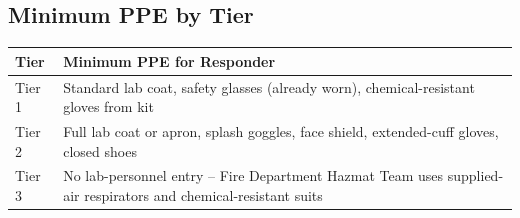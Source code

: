 \subsection*{Minimum PPE by Tier}
\renewcommand{\arraystretch}{1.2}
\begin{tabularx}{\linewidth}{@{}l X@{}}
\toprule
\textbf{Tier} & \textbf{Minimum PPE for Responder}\\
\midrule
Tier 1 & Standard lab coat, safety glasses (already worn), chemical-resistant gloves from kit\\
Tier 2 & Full lab coat or apron, splash goggles, face shield, extended-cuff gloves, closed shoes\\
Tier 3 & No lab-personnel entry -- Fire Department Hazmat Team uses supplied-air respirators and
  chemical-resistant suits\\
\bottomrule
\end{tabularx}

